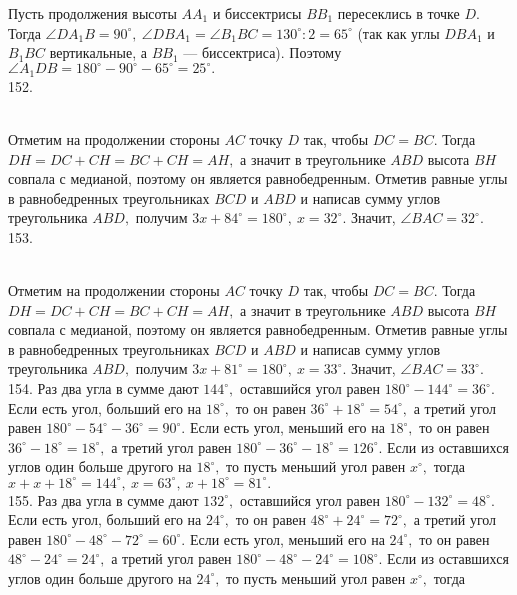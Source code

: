 Пусть продолжения высоты $AA_1$ и биссектрисы $BB_1$ пересеклись в точке $D.$ Тогда $\angle DA_1B=90^\circ,\ \angle DBA_1=\angle B_1BC=130^\circ:2=65^\circ$ (так как углы $DBA_1$ и $B_1BC$ вертикальные, а $BB_1$ --- биссектриса). Поэтому $\angle A_1DB=180^\circ-90^\circ-65^\circ=25^\circ.$\\
152. \begin{figure}[ht!]
\end{figure}\\
Отметим на продолжении стороны $AC$ точку $D$ так, чтобы $DC=BC.$ Тогда $DH=DC+CH=BC+CH=AH,$ а значит в треугольнике $ABD$ высота $BH$ совпала с медианой, поэтому он является равнобедренным. Отметив равные углы в равнобедренных треугольниках $BCD$ и $ABD$ и написав сумму углов треугольника $ABD,$ получим $3x+84^\circ=180^\circ,\ x=32^\circ.$ Значит, $\angle BAC=32^\circ.$\\
153. \begin{figure}[ht!]
\end{figure}\\
Отметим на продолжении стороны $AC$ точку $D$ так, чтобы $DC=BC.$ Тогда $DH=DC+CH=BC+CH=AH,$ а значит в треугольнике $ABD$ высота $BH$ совпала с медианой, поэтому он является равнобедренным. Отметив равные углы в равнобедренных треугольниках $BCD$ и $ABD$ и написав сумму углов треугольника $ABD,$ получим $3x+81^\circ=180^\circ,\ x=33^\circ.$ Значит, $\angle BAC=33^\circ.$\\
154. Раз два угла в сумме дают $144^\circ,$ оставшийся угол равен $180^\circ-144^\circ=36^\circ.$ Если есть угол, больший его на $18^\circ,$ то он равен $36^\circ+18^\circ=54^\circ,$ а третий угол равен $180^\circ-54^\circ-36^\circ=90^\circ.$ Если есть угол, меньший его на $18^\circ,$ то он равен $36^\circ-18^\circ=18^\circ,$ а третий угол равен
$180^\circ-36^\circ-18^\circ=126^\circ.$ Если из оставшихся углов один больше другого на $18^\circ,$ то пусть меньший угол равен $x^\circ,$ тогда
$x+x+18^\circ=144^\circ,\ x=63^\circ,\ x+18^\circ=81^\circ.$\\
155. Раз два угла в сумме дают $132^\circ,$ оставшийся угол равен $180^\circ-132^\circ=48^\circ.$ Если есть угол, больший его на $24^\circ,$ то он равен $48^\circ+24^\circ=72^\circ,$ а третий угол равен $180^\circ-48^\circ-72^\circ=60^\circ.$ Если есть угол, меньший его на $24^\circ,$ то он равен $48^\circ-24^\circ=24^\circ,$ а третий угол равен
$180^\circ-48^\circ-24^\circ=108^\circ.$ Если из оставшихся углов один больше другого на $24^\circ,$ то пусть меньший угол равен $x^\circ,$ тогда
